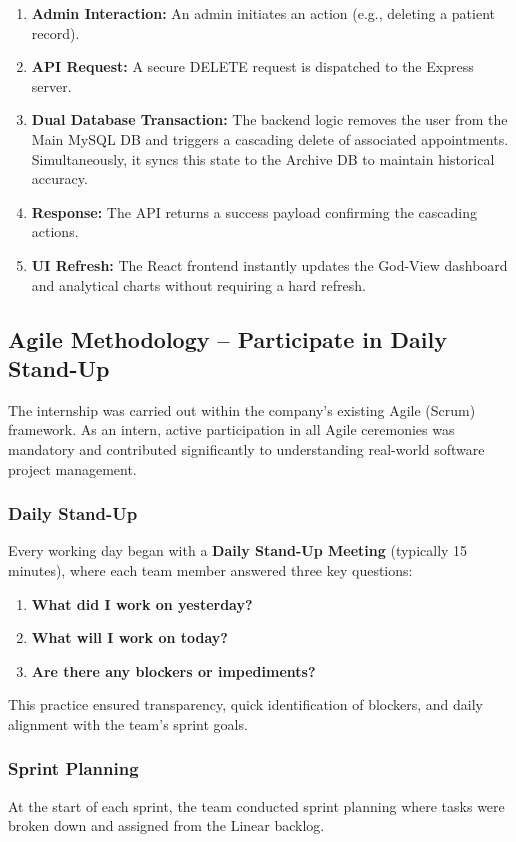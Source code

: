 \documentclass[12pt,a4paper]{article}
\begin{document}
\begin{enumerate}
    \item \textbf{Admin Interaction:} An admin initiates an action (e.g., deleting a patient record).
    \item \textbf{API Request:} A secure DELETE request is dispatched to the Express server.
    \item \textbf{Dual Database Transaction:} The backend logic removes the user from the Main MySQL DB and triggers a cascading delete of associated appointments. Simultaneously, it syncs this state to the Archive DB to maintain historical accuracy.
    \item \textbf{Response:} The API returns a success payload confirming the cascading actions.
    \item \textbf{UI Refresh:} The React frontend instantly updates the God-View dashboard and analytical charts without requiring a hard refresh.
\end{enumerate}

\subsection{Agile Methodology -- Participate in Daily Stand-Up}

The internship was carried out within the company's existing Agile (Scrum) framework. As an intern, active participation in all Agile ceremonies was mandatory and contributed significantly to understanding real-world software project management.

\subsubsection{Daily Stand-Up}
Every working day began with a \textbf{Daily Stand-Up Meeting} (typically 15 minutes), where each team member answered three key questions:
\begin{enumerate}
    \item \textbf{What did I work on yesterday?}
    \item \textbf{What will I work on today?}
    \item \textbf{Are there any blockers or impediments?}
\end{enumerate}

This practice ensured transparency, quick identification of blockers, and daily alignment with the team's sprint goals.

\subsubsection{Sprint Planning}
At the start of each sprint, the team conducted sprint planning where tasks were broken down and assigned from the Linear backlog.
\end{document}
